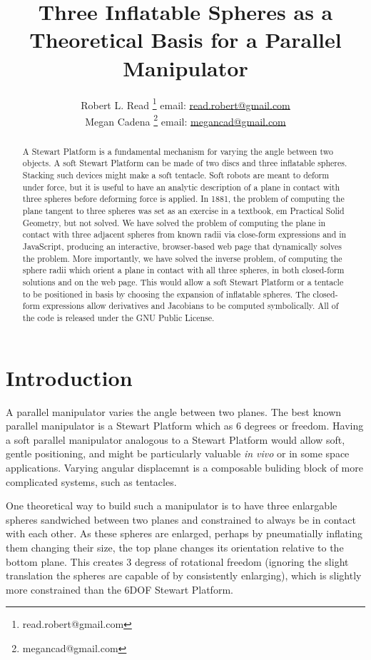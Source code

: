\documentclass{article}
\title{Three Inflatable Spheres as a Theoretical Basis for a Parallel Manipulator}
\author{Robert L. Read
  \thanks{read.robert@gmail.com}
  email: \href{mailto:read.robert@gmail.com}{read.robert@gmail.com}\\
Megan Cadena
  \thanks{megancad@gmail.com}
  email: \href{mailto:megancad@gmail.com}{megancad@gmail.com}
  }
\begin{document}
\maketitle
\begin{abstract}
  A Stewart Platform\cite{wiki:stewart} is a fundamental mechanism for varying the angle
  between two objects.
  A soft Stewart Platform can be made of two discs and
  three inflatable spheres.
  Stacking such devices might make a soft tentacle.
  Soft robots are meant to deform under force, but it is useful to have
  an analytic description of a plane in contact with three spheres
  before deforming force is applied.
  In 1881, the problem of computing the plane tangent to three spheres was
  set as an exercise in a textbook, {em Practical Solid Geometry}\cite{payne1881},
  but not solved.
  We have solved the problem of computing the plane in contact with
  three adjacent spheres from known radii via close-form expressions and
  in JavaScript, producing an interactive,
  browser-based web page that dynamically solves the problem\cite{softrobotcalc}.
  More importantly, we have solved the inverse problem, of computing the
  sphere radii which orient a plane in contact with all three spheres, in
  both closed-form solutions and on the web page.
  This would allow a soft Stewart Platform or a tentacle to be positioned
  in basis by choosing the expansion of inflatable spheres.
  The closed-form expressions allow derivatives and Jacobians to be computed
  symbolically.
  All of the code is released under the GNU Public License.
\end{abstract}


\section{Introduction}

A parallel manipulator varies the angle between two planes.
The best known parallel manipulator is
a Stewart Platform\cite{wiki:stewart} which as 6 degrees or freedom.
Having a soft parallel manipulator analogous to a Stewart Platform would allow soft,
gentle positioning,
and might be particularly valuable {\it in vivo}\cite{white2018soft} or in some space applications\cite{glassner2020soft}.
Varying angular displacemnt is a composable buliding block of more complicated systems, such as tentacles.

One theoretical way to build such a manipulator is to have three enlargable spheres sandwiched between two planes
and constrained to always be in contact with each other.
As these spheres are enlarged, perhaps by pneumatially inflating them changing
their size, the top plane changes its orientation relative to the bottom plane.
This creates 3 degress of rotational freedom
(ignoring the slight translation the spheres are capable of by consistently enlarging),
which is slightly more constrained than the 6DOF Stewart Platform.
\end{document}
